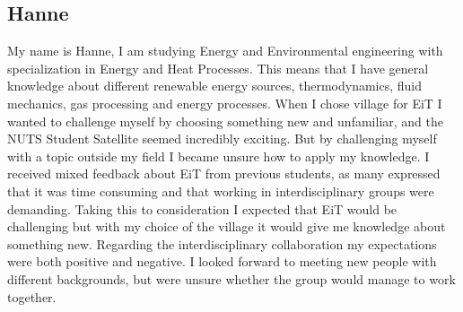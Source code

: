 \subsection{Hanne}

My name is Hanne, I am studying Energy and Environmental engineering with specialization in Energy and Heat Processes. This means that I have general knowledge about different renewable energy sources, thermodynamics, fluid mechanics, gas processing and energy processes. When I chose village for EiT I wanted to challenge myself by choosing something new and unfamiliar, and the NUTS Student Satellite seemed incredibly exciting. But by challenging myself with a topic outside my field I became unsure how to apply my knowledge. I received mixed feedback about EiT from previous students, as many expressed that it was time consuming and that working in interdisciplinary groups were demanding. Taking this to consideration I expected that EiT would be challenging but with my choice of the village it would give me knowledge about something new. Regarding the interdisciplinary collaboration my expectations were both positive and negative. I looked forward to meeting new people with different backgrounds, but were unsure whether the group would manage to work together. 